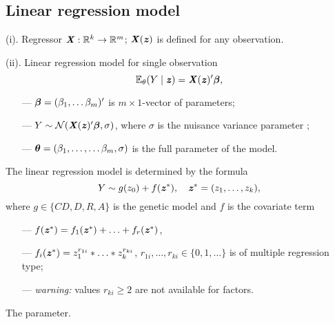\documentclass[11pt]{article}
\begin{document}
\subsection*{Linear regression model} 

\noindent(i). Regressor $\mbox{\textbf{\textit X}}:{\mathbb R}^k\to{\mathbb R}^m$; $\mbox{\textbf{\textit X}}(\mbox{\textbf{\textit z}})$ is defined for any observation.

\noindent(ii). Linear regression model for single observation 
$$
\E_{\theta}(Y\mid\zbi)=\Xbi(\zbi)'\betab,
\vspace{-3mm}
$$
\begin{itemize}
\setlength\itemsep{-0.3em}
\item[---]
${\boldsymbol \beta}=(\beta_1,\ldots\beta_m)'$ is $m\times 1$-vector of parameters;
\item[---]
$Y\sim {\cal N}(\mbox{\textbf{\textit X}}(\mbox{\textbf{\textit z}})'{\boldsymbol \beta},\sigma)$, where $\sigma$ is the nuisance variance parameter ;
\item[---]
${\boldsymbol \theta}=(\beta_1,\ldots,\ldots\beta_m,\sigma)$ is the full parameter of the model.
\end{itemize}
The linear regression model is determined by the formula 
$$
Y\sim g(z_0)+f(\zbi^*),\quad \zbi^*=(z_1,\ldots,z_k),
\vspace{-2mm}
$$
where $g\in \{CD,D,R,A\}$ is the genetic model and $f$ is the covariate term
\vspace{-2mm}
\begin{itemize}
\setlength\itemsep{-0.3em}
\item[---]
$f(\mbox{\textbf{\textit z}}^*)=f_1(\mbox{\textbf{\textit z}}^*)+\ldots+f_r(\mbox{\textbf{\textit z}}^*)$, 
\item[---]
$f_i(\mbox{\textbf{\textit z}}^*)=z_1^{r_{1i}}*\ldots*z_k^{r_{ki}}$, $r_{1i},\ldots,r_{ki}\in\{0,1,\ldots\}$ is of multiple regression type;
\item[---]
\textit{warning:} values $r_{ki}\geq 2$ are not available for factors.
\end{itemize}
The parameter.\vspace{-2mm}
\end{document}
